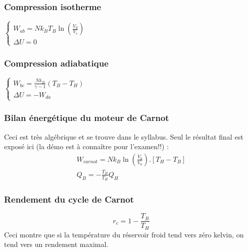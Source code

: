 \documentclass	[11pt, a4paper, openany]{book}
\begin{document}
\subsubsection{Compression isotherme}
$\left\{\begin{array}{l}
W_{ab} = Nk_BT_B\ln\left(\frac{V_d}{V_c}\right)\\
\Delta U = 0
\end{array}\right.$

\subsubsection{Compression adiabatique}
$\left\{\begin{array}{l}
W_{bc} = \frac{Nk_B}{\gamma - 1}(T_B - T_H)\\
\Delta U = - W_{da}
\end{array}\right.$

\subsubsection{Bilan énergétique du moteur de Carnot}
Ceci est très algébrique et se trouve dans le syllabus. Seul le résultat final est exposé ici (la démo est à connaître pour l'examen!!) :
\begin{eqnarray}
	W_{carnot} = Nk_B\ln\left(\frac{V_b}{V_a}\right).\left[T_H - T_B\right]\\
	Q_B = -\frac{T_B}{T_H}Q_H
\end{eqnarray}


\subsubsection{Rendement du cycle de Carnot}
\begin{equation}
	r_c = 1 - \frac{T_B}{T_H}
\end{equation}
Ceci montre que si la température du réservoir froid tend vers zéro kelvin, on tend vers un rendement maximal.
\end{document}
